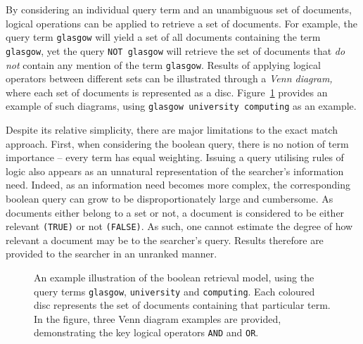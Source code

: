 By considering an individual query term and an unambiguous set of documents, logical operations can be applied to retrieve a set of documents. For example, the query term \texttt{glasgow} will yield a set of all documents containing the term \texttt{glasgow}, yet the query \texttt{NOT glasgow} will retrieve the set of documents that \emph{do not} contain any mention of the term \texttt{glasgow}. Results of applying logical operators between different sets can be illustrated through a \emph{Venn diagram,} where each set of documents is represented as a disc. Figure~\ref{fig:boolean} provides an example of such diagrams, using \texttt{glasgow university computing} as an example.

Despite its relative simplicity, there are major limitations to the exact match approach. First, when considering the boolean query, there is no notion of term importance -- every term has equal weighting. Issuing a query utilising rules of logic also appears as an unnatural representation of the searcher's information need. Indeed, as an information need becomes more complex, the corresponding boolean query can grow to be disproportionately large and cumbersome. As documents either belong to a set or not, a document is considered to be either relevant \texttt{(TRUE)} or not \texttt{(FALSE)}. As such, one cannot estimate the degree of how relevant a document may be to the searcher's query. Results therefore are provided to the searcher in an unranked manner.

\begin{figure}[t!]
    \centering
    \caption[Venn diagrams illustrating boolean retrieval]{An example illustration of the boolean retrieval model, using the query terms \texttt{glasgow}, \texttt{university} and \texttt{computing}. Each coloured disc represents the set of documents containing that particular term. In the figure, three Venn diagram examples are provided, demonstrating the key logical operators \texttt{AND} and \texttt{OR}.}
    \label{fig:boolean}
\end{figure}

